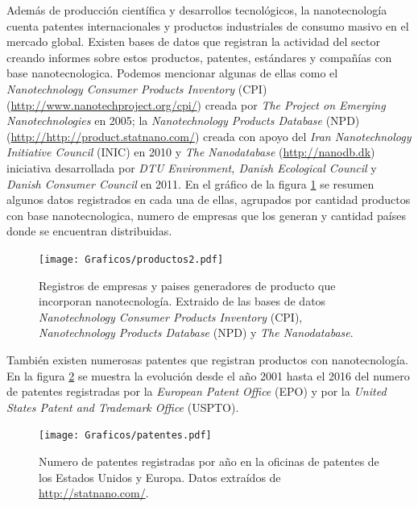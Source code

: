 	Además de producción científica y desarrollos tecnológicos, la nanotecnología cuenta patentes internacionales y productos industriales de consumo masivo en el mercado global. Existen bases de datos que registran la actividad del sector creando informes sobre estos productos, patentes, estándares y compañías con base nanotecnologica. Podemos mencionar algunas de ellas como el \textit{Nanotechnology Consumer Products Inventory} (CPI) (\url{http://www.nanotechproject.org/cpi/}) creada por \textit{The Project on Emerging Nanotechnologies} en 2005\cite{Vance2015}; la \textit{Nanotechnology Products Database} (NPD) (\url{http://http://product.statnano.com/}) creada con apoyo del \textit{Iran Nanotechnology Initiative Council} (INIC) en 2010 y \textit{The Nanodatabase} (\url{http://nanodb.dk}) iniciativa desarrollada por \textit{DTU Environment, Danish Ecological Council} y \textit{Danish Consumer Council} en 2011. En el gráfico de la figura \ref{fig:productos} se resumen algunos datos registrados en cada una de ellas, agrupados por cantidad productos con base nanotecnologica, numero de empresas que los generan y cantidad países donde se encuentran distribuidas.

		\begin{figure}[ht!]
 			\begin{center}
 			\texttt{[image: Graficos/productos2.pdf]}
 			\caption[Cantidad de productos, compañías y origen con base nanotecnologica]{Registros de empresas y paises generadores de producto que incorporan nanotecnología. Extraido de las bases de datos \textit{Nanotechnology Consumer Products Inventory} (CPI), \textit{Nanotechnology Products Database} (NPD) y \textit{The Nanodatabase}.}
 			\label{fig:productos}
 		    \end{center}
 		    \end{figure}

 	También existen numerosas patentes que registran productos con nanotecnología. En la figura \ref{fig:patentes} se muestra la evolución desde el año 2001 hasta el 2016 del numero de patentes registradas por la \textit{European Patent Office} (EPO) y por la \textit{United States Patent and Trademark Office} (USPTO).

		\begin{figure}[ht!]
 			\begin{center}
 			\texttt{[image: Graficos/patentes.pdf]}
 			\caption[Numero de patentes de productos en base nanotecnologica]{Numero de patentes registradas por año en la oficinas de patentes de los Estados Unidos y Europa. Datos extraídos de \url{http://statnano.com/}.}
 			\label{fig:patentes}
 		    \end{center}
 		    \end{figure}


